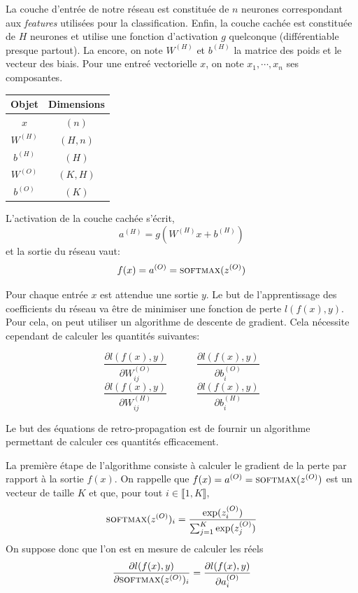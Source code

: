 \documentclass[ebook,10pt,oneside,openany,final, french, a4paper]{memoir}
\begin{document}
\begin{multicols*}{2}[]
La couche d'entrée de notre réseau est constituée de $n$ neurones 
correspondant aux \textit{features} utilisées pour la classification.
Enfin, la couche cachée est constituée de $H$ neurones et utilise 
une fonction d'activation $g$ quelconque (différentiable presque 
partout).
La encore, on note $W^{(H)}$ et $b^{(H)}$ la matrice des poids 
et le vecteur des biais.
Pour une entreé vectorielle $x$, on note $x_1, \cdots, x_n$ ses 
composantes.

\begin{center}
\begin{tabular}{|c|c|}
  \hline
  Objet   & Dimensions \\
  \hline
  $x$       & $(n)$ \\
  $W^{(H)}$ & $(H, n)$ \\
  $b^{(H)}$ & $(H)$ \\
  $W^{(O)}$ & $(K, H)$ \\
  $b^{(O)}$ & $(K)$ \\
  \hline
\end{tabular}
\end{center}

L'activation de la couche cachée s'écrit,
\[
a^{(H)} = g(W^{(H)}x + b^{(H)})
\] 
et la sortie du réseau vaut:
\[
f(x) = a^{(O)} = \textsc{softmax}(z^{(O)})
\] 

Pour chaque entrée $x$ est attendue une sortie $y$. 
Le but de l'apprentissage des coefficients du réseau 
va être de minimiser une fonction de perte 
$l(f(x), y)$.
Pour cela, on peut utiliser un algorithme de descente 
de gradient. 
Cela nécessite cependant de calculer les quantités 
suivantes:

\[
\frac{\partial l(f(x), y)}{\partial W^{(O)}_{ij}} \qquad \quad
\frac{\partial l(f(x), y)}{\partial b^{(O)}_{i}}
\] 
\[
\frac{\partial l(f(x), y)}{\partial W^{(H)}_{ij}} \qquad \quad
\frac{\partial l(f(x), y)}{\partial b^{(H)}_{i}}
\] 

Le but des équations de retro-propagation est de fournir 
un algorithme permettant de calculer ces quantités 
efficacement.

\vspace{1em}

La première étape de l'algorithme consiste à calculer le 
gradient de la perte par rapport à la sortie $f(x)$. 
On rappelle que $f(x) = a^{(O)} = \textsc{softmax}(z^{(O)})$ est un 
vecteur de taille $K$ et que, pour tout 
$i \in \llbracket 1, K \rrbracket$,
\[
\textsc{softmax}(z^{(O)})_i = \frac{\exp(z^{(O)}_i)}{\sum_{j=1}^{K} \exp(z^{(O)}_j)}
\] 
On suppose donc que l'on est en mesure de calculer les réels
\[
\frac{\partial l(f(x), y)}{\partial \textsc{softmax}(z^{(O)})_i} = 
\frac{\partial l(f(x), y)}{\partial a^{(O)}_i}
\] 


\end{multicols*}
\end{document}
